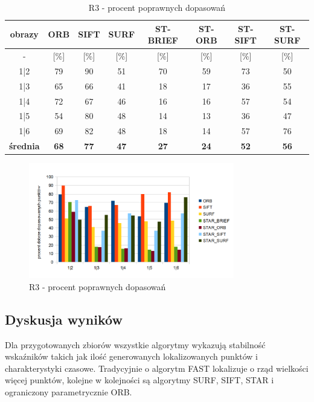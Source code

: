 \begin{table}[htbp]
  \centering
  \caption{R3 - procent poprawnych dopasowań}
    \begin{tabular}{|c|c|c|c|c|c|c|c|}\hline
    obrazy & \textbf{ORB} & \textbf{SIFT} & \textbf{SURF} & \textbf{ST-BRIEF} & \textbf{ST-ORB} & \textbf{ST-SIFT} & \textbf{ST-SURF} \\\hline
     - & [\%] & [\%] & [\%] & [\%] & [\%] & [\%] & [\%] \\\hline
    1|2 & 79 & 90 & 51 & 70 & 59 & 73 & 50 \\
    1|3 & 65 & 66 & 41 & 18 & 17 & 36 & 55 \\
    1|4 & 72 & 67 & 46 & 16 & 16 & 57 & 54 \\
    1|5 & 54 & 80 & 48 & 14 & 13 & 36 & 47 \\
    1|6 & 69 & 82 & 48 & 18 & 14 & 57 & 76 \\\hline
    \textbf{średnia} & \textbf{68} & \textbf{77} & \textbf{47} & \textbf{27} & \textbf{24} & \textbf{52} & \textbf{56} \\\hline
    
    \end{tabular}%
  \label{tab:r3_m2}%
\end{table}%


\begin{figure}
\centering
\includegraphics[width=0.8\textwidth]{pict/slowik/r3/m2.png}
\caption{R3 - procent poprawnych dopasowań}
\label{fig:r3_m2}
\end{figure}


\FloatBarrier
\subsection{Dyskusja wyników}
Dla przygotowanych zbiorów wszystkie algorytmy wykazują stabilność wskaźników takich jak ilość generowanych lokalizowanych punktów i charakterystyki czasowe. Tradycyjnie o algorytm FAST lokalizuje o rząd wielkości więcej punktów, kolejne w kolejności są algorytmy SURF, SIFT, STAR i ograniczony parametrycznie ORB.

